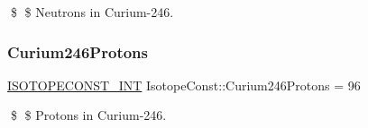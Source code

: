 \$ \$ Neutrons in Curium-\/246. \mbox{\label{group___isotope_const-_curium-_cm246_ga102ff8c5eae1bfa4c187a49c1fb77176}} 
\subsubsection{\texorpdfstring{Curium246\+Protons}{Curium246Protons}}
{\footnotesize\ttfamily \mbox{\hyperlink{group___isotope_const-_macros_ga5f18360b3e99483a35c32d789e62621c}{I\+S\+O\+T\+O\+P\+E\+C\+O\+N\+S\+T\+\_\+\+I\+NT}} Isotope\+Const\+::\+Curium246\+Protons = 96}

\$ \$ Protons in Curium-\/246. 
